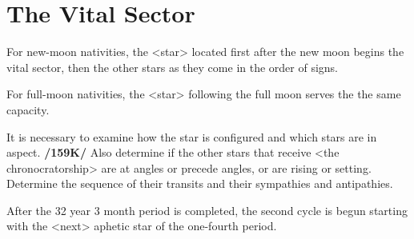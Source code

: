 \section{The Vital Sector}

For new-moon nativities, the <star> located first after the new moon begins the vital sector, then the other stars as they come in the order of signs. 

For full-moon nativities, the <star> following the full moon
serves the the same capacity. 

It is necessary to examine how the star is configured and which stars are in aspect. \textbf{/159K/} Also determine if the other stars that receive <the chronocratorship> are at angles or precede angles, or are rising or setting. Determine the sequence of their transits and their sympathies and antipathies. 

After the 32 year 3 month period is completed, the second cycle is begun starting with the <next> aphetic star of the one-fourth period.

\newpage